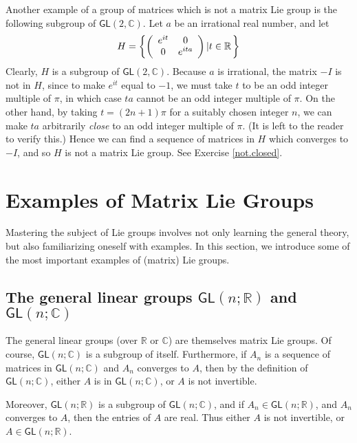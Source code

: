 \documentclass[12pt]{amsbook}
\theoremstyle{plain}
\numberwithin{equation}{chapter}
\numberwithin{theorem}{chapter}
\begin{document}
Another example of a group of matrices which is not a matrix Lie group is the
following subgroup of $\mathsf{GL}(2,\mathbb{C})$. Let $a$ be an irrational
real number, and let
\[
H=\left\{  \left(
\begin{array}
[c]{cc}%
e^{it} & 0\\
0 & e^{ita}%
\end{array}
\right)  \left|  t\in\mathbb{R}\right.  \right\}
\]
Clearly, $H$ is a subgroup of $\mathsf{GL}(2,\mathbb{C})$. Because $a$ is
irrational, the matrix $-I$ is not in $H$, since to make $e^{it}$ equal to
$-1$, we must take $t$ to be an odd integer multiple of $\pi$, in which case
$ta$ cannot be an odd integer multiple of $\pi$. On the other hand, by taking
$t=(2n+1)\pi$ for a suitably chosen integer $n$, we can make $ta$ arbitrarily
\textit{close }to an odd integer multiple of $\pi$. (It is left to the reader
to verify this.) Hence we can find a sequence of matrices in $H $ which
converges to $-I$, and so $H$ is not a matrix Lie group. See Exercise
\ref{not.closed}.

\section{Examples of Matrix Lie Groups}

Mastering the subject of Lie groups involves not only learning the general
theory, but also familiarizing oneself with examples. In this section, we
introduce some of the most important examples of (matrix) Lie groups.

\subsection{The general linear groups $\mathsf{GL}(n;\mathbb{R})$ and
$\mathsf{GL}(n;\mathbb{C})$}

The general linear groups (over $\mathbb{R}$ or $\mathbb{C}$) are themselves
matrix Lie groups. Of course, $\mathsf{GL}(n;\mathbb{C})$ is a subgroup of
itself. Furthermore, if $A_{n}$ is a sequence of matrices in $\mathsf{GL}%
(n;\mathbb{C})$ and $A_{n}$ converges to $A$, then by the definition of
$\mathsf{GL}(n;\mathbb{C})$, either $A$ is in $\mathsf{GL}(n;\mathbb{C})$, or
$A$ is not invertible.

Moreover, $\mathsf{GL}(n;\mathbb{R})$ is a subgroup of $\mathsf{GL}%
(n;\mathbb{C})$, and if $A_{n}\in\mathsf{GL}(n;\mathbb{R})$, and $A_{n}$
converges to $A$, then the entries of $A$ are real. Thus either $A$ is not
invertible, or $A\in\mathsf{GL}(n;\mathbb{R})$.
\end{document}
